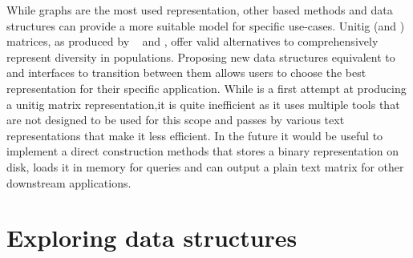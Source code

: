 While graphs are the most used representation, other \kmer based methods and data structures can provide a more suitable model for specific use-cases. Unitig (and \kmer) matrices, as produced by  \kmt~\cite{kmtricks} and \muset, offer valid alternatives to comprehensively represent diversity in populations. Proposing new data structures equivalent to \ccdbgs and interfaces to transition between them allows users to choose the best representation for their specific application. While \muset is a first attempt at producing a unitig matrix representation,it is quite inefficient as it uses multiple tools that are not designed to be used for this scope and passes by various text representations that make it less efficient. In the future it would be useful to implement a direct construction methods that stores a binary representation on disk, loads it in memory for queries and can output a plain text matrix for other downstream applications. 


\section{Exploring \kmer data structures}


